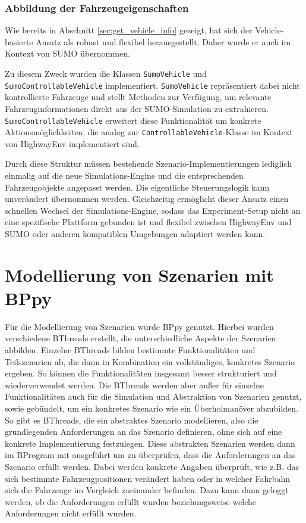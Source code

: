\subsubsection{Abbildung der Fahrzeugeigenschaften}
Wie bereits in Abschnitt \ref{sec:get_vehicle_info} gezeigt, hat sich der Vehicle-basierte Ansatz als robust und flexibel herausgestellt. Daher wurde er auch im Kontext von SUMO übernommen.

Zu diesem Zweck wurden die Klassen \texttt{SumoVehicle} und \texttt{SumoControllableVehicle} implementiert. \texttt{SumoVehicle} repräsentiert dabei nicht kontrollierte Fahrzeuge und stellt Methoden zur Verfügung, um relevante Fahrzeuginformationen direkt aus der SUMO-Simulation zu extrahieren. \texttt{SumoControllableVehicle} erweitert diese Funktionalität um konkrete Aktionsmöglichkeiten, die analog zur \texttt{ControllableVehicle}-Klasse im Kontext von HighwayEnv implementiert sind.

Durch diese Struktur müssen bestehende Szenario-Implementierungen lediglich einmalig auf die neue Simulations-Engine und die entsprechenden Fahrzeugobjekte angepasst werden. Die eigentliche Steuerungslogik kann unverändert übernommen werden. Gleichzeitig ermöglicht dieser Ansatz einen schnellen Wechsel der Simulations-Engine, sodass das Experiment-Setup nicht an eine spezifische Plattform gebunden ist und flexibel zwischen HighwayEnv und SUMO oder anderen kompatiblen Umgebungen adaptiert werden kann.

\section{Modellierung von Szenarien mit BPpy}
Für die Modellierung von Szenarien wurde BPpy genutzt. Hierbei wurden verschiedene BThreads erstellt, die unterschiedliche Aspekte der Szenarien abbilden.
Einzelne BThreads bilden bestimmte Funktionalitäten und Teilszenarien ab, die dann in Kombination ein vollständiges, konkretes Szenario ergeben. So können die Funktionalitäten insgesamt besser strukturiert und wiederverwendet werden.
Die BThreads werden aber außer für einzelne Funktionalitäten auch für die Simulation und Abstraktion von Szenarien genutzt, sowie gebündelt, um ein konkretes Szenario wie ein Überholmanöver abzubilden.
So gibt es BThreads, die ein abstraktes Szenario modellieren, also die grundlegenden Anforderungen an das Szenario definieren, ohne sich auf eine konkrete Implementierung festzulegen. Diese abstrakten Szenarien werden dann im BProgram mit ausgeführt um zu überprüfen, dass die Anforderungen an das Szenario erfüllt werden.
Dabei werden konkrete Angaben überprüft, wie z.B. das sich bestimmte Fahrzeugpositionen verändert haben oder in welcher Fahrbahn sich die Fahrzeuge im Vergleich zueinander befinden.
Dazu kann dann geloggt werden, ob die Anforderungen erfüllt wurden beziehungsweise welche Anforderungen nicht erfüllt wurden.

